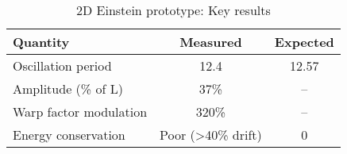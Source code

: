\begin{table}[htbp]
\centering
\caption{2D Einstein prototype: Key results}
\label{tab:einstein2d}
\begin{tabular}{lcc}
\toprule
Quantity & Measured & Expected \\
\midrule
Oscillation period & 12.4 & 12.57 \\
Amplitude (\% of L) & 37\% & -- \\
Warp factor modulation & 320\% & -- \\
Energy conservation & Poor (>40\% drift) & 0 \\
\bottomrule
\end{tabular}
\end{table}
